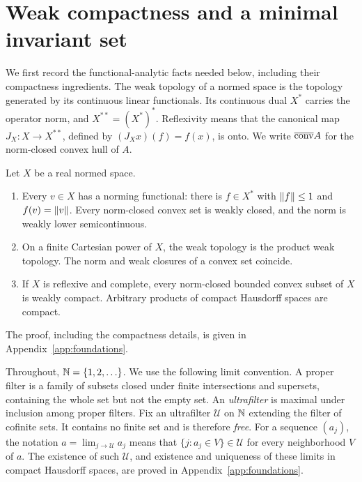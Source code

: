 \section{Weak compactness and a minimal invariant set}\label{sec:prelim}

We first record the functional-analytic facts needed below, including their
compactness ingredients. The weak topology of a normed space is the topology
generated by its continuous linear functionals. Its continuous dual $X^*$
carries the operator norm, and $X^{**}=(X^*)^*$. Reflexivity means that
the canonical map $J_X:X\to X^{**}$, defined by $(J_Xx)(f)=f(x)$, is onto.
We write
$\overline{\operatorname{conv}} A$ for the norm-closed convex hull of $A$.

\begin{lemma}\label{lem:weak-facts}
Let $X$ be a real normed space.
\begin{enumerate}
\item Every $v\in X$ has a norming functional: there is $f\in X^*$ with
      $\lVert f\rVert\leq 1$ and $f(v)=\lVert v\rVert$. Every norm-closed convex set is
      weakly closed, and the norm is weakly lower semicontinuous.
\item On a finite Cartesian power of $X$, the weak topology is the product
      weak topology. The norm and weak closures of a convex set coincide.
\item If $X$ is reflexive and complete, every norm-closed bounded convex
      subset of $X$ is weakly compact. Arbitrary products of compact
      Hausdorff spaces are compact.
\end{enumerate}
\end{lemma}

The proof, including the compactness details, is given in
Appendix~\ref{app:foundations}.


Throughout, $\mathbb N=\{1,2,\ldots\}$. We use the following limit convention.
A proper filter is a family of
subsets closed under finite intersections and supersets, containing the
whole set but not the empty set. An \emph{ultrafilter} is maximal under
inclusion among proper filters. Fix an ultrafilter $\mathcal U$ on $\mathbb N$
extending the filter of cofinite sets. It contains no finite set and is
therefore \emph{free}. For a sequence $(a_j)$, the notation
$a=\lim_{j\to\mathcal U}a_j$ means that
$\{j:a_j\in V\}\in\mathcal U$ for every neighborhood $V$ of $a$.
The existence of such $\mathcal U$, and existence and uniqueness of
these limits in compact Hausdorff spaces, are proved in
Appendix~\ref{app:foundations}.


